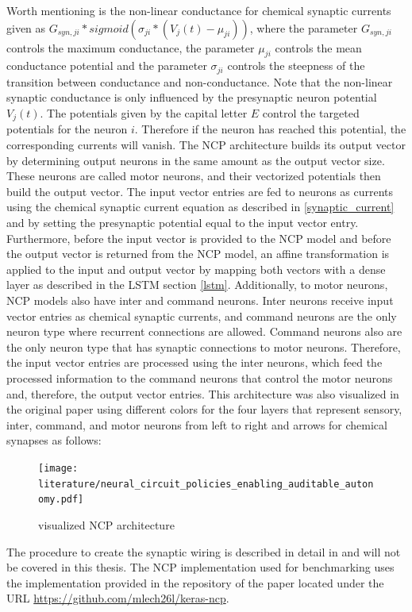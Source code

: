 \documentclass[draft,final]{vutinfth} %
\begin{document}
Worth mentioning is the non-linear conductance for chemical synaptic currents given as $G_{syn,ji} * sigmoid(\sigma_{ji}*(V_j(t)-\mu_{ji}))$, where the parameter $G_{syn,ji}$ controls the maximum conductance, the parameter $\mu_{ji}$ controls the mean conductance potential and the parameter $\sigma_{ji}$ controls the steepness of the transition between conductance and non-conductance.
Note that the non-linear synaptic conductance is only influenced by the presynaptic neuron potential $V_j(t)$.
The potentials given by the capital letter $E$ control the targeted potentials for the neuron $i$. Therefore if the neuron has reached this potential, the corresponding currents will vanish.
The NCP architecture builds its output vector by determining output neurons in the same amount as the output vector size.
These neurons are called motor neurons, and their vectorized potentials then build the output vector.
The input vector entries are fed to neurons as currents using the chemical synaptic current equation as described in \ref{synaptic_current} and by setting the presynaptic potential equal to the input vector entry.
Furthermore, before the input vector is provided to the NCP model and before the output vector is returned from the NCP model, an affine transformation is applied to the input and output vector by mapping both vectors with a dense layer as described in the LSTM section \ref{lstm}.
Additionally, to motor neurons, NCP models also have inter and command neurons.
Inter neurons receive input vector entries as chemical synaptic currents, and command neurons are the only neuron type where recurrent connections are allowed.
Command neurons also are the only neuron type that has synaptic connections to motor neurons.
Therefore, the input vector entries are processed using the inter neurons, which feed the processed information to the command neurons that control the motor neurons and, therefore, the output vector entries.
This architecture was also visualized in the original paper using different colors for the four layers that represent sensory, inter, command, and motor neurons from left to right and arrows for chemical synapses as follows:
\begin{figure}[H]
\centering{}
\texttt{[image: literature/neural\_circuit\_policies\_enabling\_auditable\_autonomy.pdf]}
\caption{visualized NCP architecture \cite[p. 3]{NCP}}
\label{fig:ncp_vis}
\end{figure}
The procedure to create the synaptic wiring is described in detail in \cite[p. 3]{NCP} and will not be covered in this thesis.
The NCP implementation used for benchmarking uses the implementation provided in the repository of the paper \cite{NCP} located under the URL \url{https://github.com/mlech26l/keras-ncp}.
\end{document}
